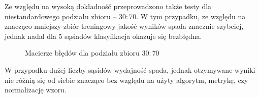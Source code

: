 \documentclass[12pt,a4paper]{article}
\begin{document}
    		Ze względu na wysoką dokładność przeprowadzono także testy dla niestandardowego podziału zbioru -- $30:70$. W tym przypadku, ze względu na znacząco mniejszy zbiór treningowy jakość wyników spada znacznie szybciej, jednak nadal dla 5 sąsiadów klasyfikacja okazuje się bezbłędna.
    		\begin{figure}[h!]
    			\centering
    			\hfil
    			\caption{Macierze błędów dla podziału zbioru $30:70$}
    			\label{fig:conf-matrix-30}
    		\end{figure}
    		
    		W przypadku dużej liczby sąsidów wydajność spada, jednak otzymywane wyniki nie różnią się od siebie znacząco bez względu na użyty algorytm, metrykę, czy normalizację wzoru.
	    
	    \newpage
\end{document}
